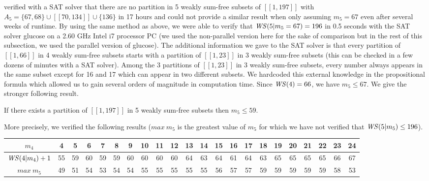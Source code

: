 \par
\cite{ELIAHOU2012175} verified with a SAT solver that there are no partition in 5 weakly sum-free subsets of
\([\![1,197]\!]\) with
\(A_5 = \{67, 68\} \cup [\![70,134]\!] \cup \{136\}\) in 17 hours and could not provide a similar result when only
assuming \(m_5 = 67\) even after several
weeks of runtime. By using the same method as above, we were able to verify that \(\mathit{WS} (5 | m_5 = 67) = 196\) in 0.5
seconds with the SAT solver glucose \cite{Glucose}
on a 2.60 GHz Intel i7 processor PC (we used the non-parallel version here for the sake of comparison but in the rest of
this subsection, we used the parallel version of glucose).
The additional information we gave to the SAT solver is that every partition of \([\![1,66]\!]\) in 4 weakly sum-free
subsets starts with a partition of
\([\![1,23]\!]\) in 3 weakly sum-free subsets (this can be checked in a few dozens of minutes with a SAT solver). Among
the 3 partitions of \([\![1,23]\!]\) in
3 weakly sum-free subsets, every number always appears in the same subset except for 16 and 17 which can appear in two
different subsets. We hardcoded
this external knowledge in the propositional formula which allowed us to gain several orders of magnitude in computation
time. Since \(\mathit{WS} (4) = 66\), we have \(m_5 \leqslant 67\). We give the stronger following result.


\begin{computational theorem}
If there exists a partition of \([\![1,197]\!]\) in 5 weakly sum-free subsets then \(m_5 \leqslant 59\).
\end{computational theorem}

More precisely, we verified the following results (\(max~m_5\) is the greatest value of \(m_5\) for which we have not
verified that \(\mathit{WS} (5 | m_5) \leq 196\)).

\renewcommand{\arraystretch}{1.5}
\setlength{\tabcolsep}{3pt}

\begin{center}
\begin{tabular}{| c | *{21}{c |}}
	\hline
	\(m_4\) & 4 & 5 & 6 & 7 & 8 & 9 & 10 & 11 & 12 & 13 & 14 & 15 & 16 & 17 & 18 & 19 & 20 & 21 & 22 & 23 & 24 \\
	\hline
	\(\mathit{WS} (4 | m_4) + 1\) & 55 & 59 & 60 & 59 & 59 & 60 & 60 & 60 & 60 & 64 & 63 & 64 & 61 & 64 & 63 & 65 & 65 & 65 & 65 & 66
	& 67 \\
	\hline
	\(max~m_5\) & 49 & 51 & 54 & 53 & 54 & 54 & 55 & 55 & 55 & 55 & 55 & 56 & 57 & 57 & 59 & 59 & 59 & 59 & 59 & 58 & 53 \\
	\hline
\end{tabular}
\end{center}

